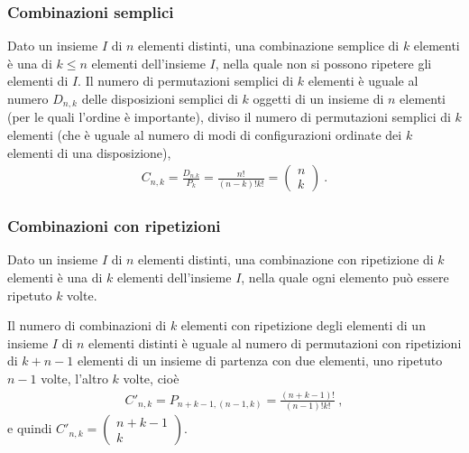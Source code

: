 \documentclass[letterpaper,10pt,italian]{jupyterBook}
\begin{document}
\subsubsection{Combinazioni semplici}
\label{\detokenize{ch/statistics/combinatorics:combinazioni-semplici}}
\sphinxAtStartPar
Dato un insieme \(I\) di \(n\) elementi distinti, una combinazione semplice di \(k\) elementi è una  di \(k \le n\) elementi dell’insieme \(I\), nella quale non si possono ripetere gli elementi di \(I\). Il numero di permutazioni semplici di \(k\) elementi è uguale al numero \(D_{n,k}\) delle disposizioni semplici di \(k\) oggetti di un insieme di \(n\) elementi (per le quali l’ordine è importante), diviso il numero di permutazioni semplici di \(k\) elementi (che è uguale al numero di modi di configurazioni ordinate dei \(k\) elementi di una disposizione),
\begin{equation*}
\begin{split}C_{n,k} = \frac{D_{n.k}}{P_k} = \frac{n!}{(n-k)! k!} = \left( \begin{matrix} n \\ k \end{matrix} \right) \ .\end{split}
\end{equation*}

\subsubsection{Combinazioni con ripetizioni}
\label{\detokenize{ch/statistics/combinatorics:combinazioni-con-ripetizioni}}
\sphinxAtStartPar
Dato un insieme \(I\) di \(n\) elementi distinti, una combinazione con ripetizione di \(k\) elementi è una  di \(k\) elementi dell’insieme \(I\), nella quale ogni elemento può essere ripetuto \(k\) volte.

\sphinxAtStartPar
Il numero di combinazioni di \(k\) elementi con ripetizione degli elementi di un insieme \(I\) di \(n\) elementi distinti è uguale al numero di permutazioni con ripetizioni di \(k + n - 1\) elementi di un insieme di partenza con due elementi, uno ripetuto \(n-1\) volte, l’altro \(k\) volte, cioè
\begin{equation*}
\begin{split}C'_{n,k} = P_{n+k-1, (n-1,k)} = \frac{(n+k-1)!}{(n-1)! k!} \ ,\end{split}
\end{equation*}
\sphinxAtStartPar
e quindi \(C'_{n,k} = \left( \begin{matrix} n+k-1 \\ k \end{matrix} \right)\).
\end{document}
